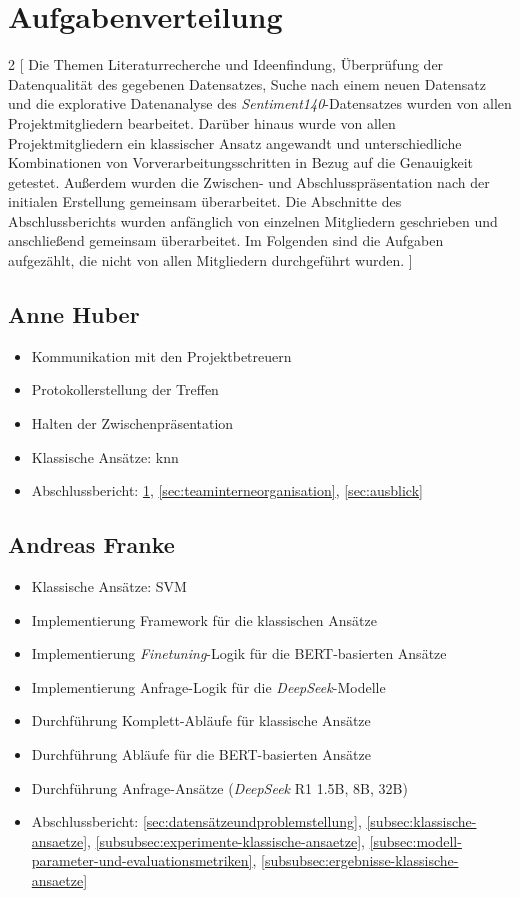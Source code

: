 \section{Aufgabenverteilung}\label{sec:aufgabenverteilung}

\begin{multicols}{2}
[
Die Themen Literaturrecherche und Ideenfindung, Überprüfung der Datenqualität des gegebenen Datensatzes, Suche nach einem neuen Datensatz und die explorative Datenanalyse des \textit{Sentiment140}-Datensatzes wurden von allen Projektmitgliedern bearbeitet.
Darüber hinaus wurde von allen Projektmitgliedern ein klassischer Ansatz angewandt und unterschiedliche Kombinationen von Vorverarbeitungsschritten in Bezug auf die Genauigkeit getestet.
Außerdem wurden die Zwischen- und Abschlusspräsentation nach der initialen Erstellung gemeinsam überarbeitet.
Die Abschnitte des Abschlussberichts wurden anfänglich von einzelnen Mitgliedern geschrieben und anschließend gemeinsam überarbeitet.
Im Folgenden sind die Aufgaben aufgezählt, die nicht von allen Mitgliedern durchgeführt wurden.
]

\subsection{Anne Huber}
\begin{itemize}
    \item Kommunikation mit den Projektbetreuern
    \item Protokollerstellung der Treffen
    \item Halten der Zwischenpräsentation
    \item Klassische Ansätze: \gls{knn}
    \item Abschlussbericht: \ref{sec:aufgabenverteilung}, \ref{sec:teaminterneorganisation}, \ref{sec:ausblick}
\end{itemize}


\subsection{Andreas Franke}
\begin{itemize}
    \item Klassische Ansätze: SVM
    \item Implementierung Framework für die klassischen Ansätze
    \item Implementierung \textit{Finetuning}-Logik für die BERT-basierten Ansätze
    \item Implementierung Anfrage-Logik für die \textit{DeepSeek}-Modelle
    \item Durchführung Komplett-Abläufe für klassische Ansätze
    \item Durchführung Abläufe für die BERT-basierten Ansätze
    \item Durchführung Anfrage-Ansätze (\textit{DeepSeek} R1 1.5B, 8B, 32B)
    \item Abschlussbericht: \ref{sec:datensätzeundproblemstellung}, \ref{subsec:klassische-ansaetze}, \ref{subsubsec:experimente-klassische-ansaetze}, \ref{subsec:modell-parameter-und-evaluationsmetriken}, \ref{subsubsec:ergebnisse-klassische-ansaetze}
\end{itemize}


\end{multicols}
